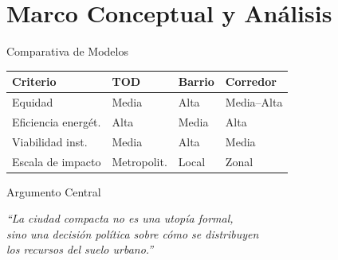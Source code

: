 
\section{Marco Conceptual y Análisis}



\begin{frame}{Comparativa de Modelos}
  \begin{table}
    \centering
    \small
    \begin{tabularx}{\textwidth}{@{} l X X X @{}}
      \toprule
      \textbf{Criterio}   & \textbf{TOD} & \textbf{Barrio} & \textbf{Corredor} \\
      \midrule
      Equidad             & Media        & Alta            & Media--Alta \\
      Eficiencia energét. & Alta         & Media           & Alta \\
      Viabilidad inst.    & Media        & Alta            & Media \\
      Escala de impacto   & Metropolit.  & Local           & Zonal \\
      \bottomrule
    \end{tabularx}
  \end{table}
\end{frame}

\begin{frame}{Argumento Central}
  \vfill
  \begin{center}
    \color{ColorPrincipal}
    \Large\itshape
    ``La ciudad compacta no es una utopía formal,\\
    sino una decisión política sobre cómo se distribuyen\\
    los recursos del suelo urbano.''
  \end{center}
  \vfill
\end{frame}

